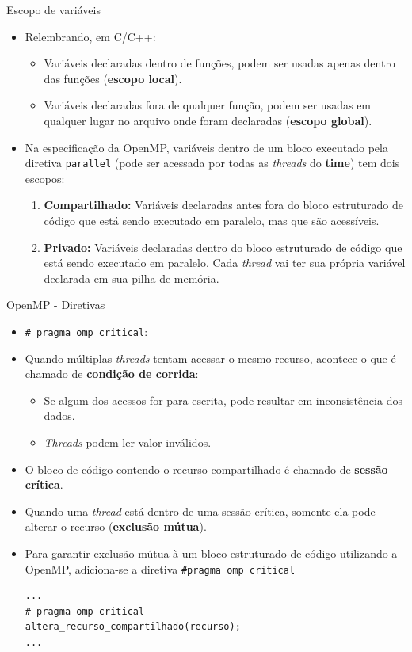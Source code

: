 \begin{frame}{Escopo de variáveis}
	\begin{itemize}
		\item Relembrando, em C/C++:
		\smallskip
		\begin{itemize}
			\item Variáveis declaradas dentro de funções, podem ser usadas apenas dentro das funções (\textbf{escopo local}).
			\smallskip
			\item Variáveis declaradas fora de qualquer função, podem ser usadas em qualquer lugar no arquivo onde foram declaradas (\textbf{escopo global}).
		\end{itemize}
		\medskip
		\pause
		\item Na especificação da OpenMP, variáveis dentro de um bloco executado pela diretiva \texttt{parallel} (pode ser acessada por todas as \textit{threads} do \textbf{time}) tem dois escopos:
		\smallskip
		\begin{enumerate}
			\item \textbf{Compartilhado:} Variáveis declaradas antes fora do bloco estruturado de código que está sendo executado em paralelo, mas que são acessíveis.
			\smallskip
			\item \textbf{Privado:} Variáveis declaradas dentro do bloco estruturado de código que está sendo executado em paralelo. Cada \textit{thread} vai ter sua própria variável declarada em sua pilha de memória.
		\end{enumerate}
	\end{itemize}
\end{frame}

\begin{frame}[fragile]{OpenMP - Diretivas}
	\begin{itemize}
		\item \texttt{\# pragma omp critical}:
		\medskip
		\item Quando múltiplas \textit{threads} tentam acessar o mesmo recurso, acontece o que é chamado de \textbf{condição de corrida}:
		\smallskip
		\begin{itemize}
			\item Se algum dos acessos for para escrita, pode resultar em inconsistência dos dados.
			\smallskip
			\item \textit{Threads} podem ler valor inválidos.
		\end{itemize}
		\medskip
		\pause
		\item O bloco de código contendo o recurso compartilhado é chamado de \textbf{sessão crítica}.
		\medskip
		\pause
		\item Quando uma \textit{thread} está dentro de uma sessão crítica, somente ela pode alterar o recurso (\textbf{exclusão mútua}).
		\medskip
		\pause
		\item Para garantir exclusão mútua à um bloco estruturado de código utilizando a OpenMP, adiciona-se a diretiva \texttt{\#pragma omp critical}
\fontsize{8pt}{7.2}\selectfont
\begin{lstlisting}
...
# pragma omp critical
altera_recurso_compartilhado(recurso);
...
\end{lstlisting}
\fontsize{10pt}{7.2}\selectfont
	\end{itemize}
\end{frame}